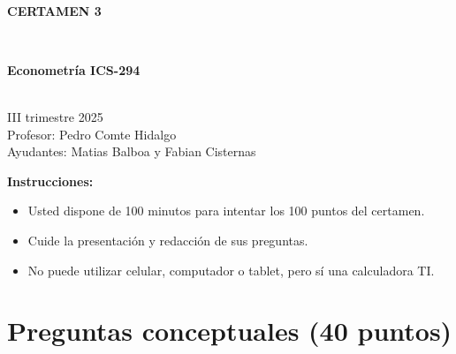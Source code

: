 \documentclass[10pt,a4paper]{article}
\begin{document}
\vspace{5cm}



\begin{center}
\begin{large}
\textbf{\\CERTAMEN 3}
\end{large}\\
\end{center}

\begin{center}
\begin{large}
\textbf{Econometría ICS-294}
\end{large}\\
\vspace{0.2cm}
III trimestre 2025\\
Profesor: Pedro Comte Hidalgo\\
Ayudantes: Matias Balboa y Fabian Cisternas
\end{center}

\textbf{Instrucciones:} 

\begin{itemize}

    \item Usted dispone de 100 minutos  para intentar los 100 puntos del certamen.
    \item Cuide la presentación y redacción de sus preguntas.
    \item No puede utilizar celular, computador o tablet, pero sí una calculadora TI.
     
\end{itemize}

\section{Preguntas conceptuales (40 puntos)}
\end{document}
